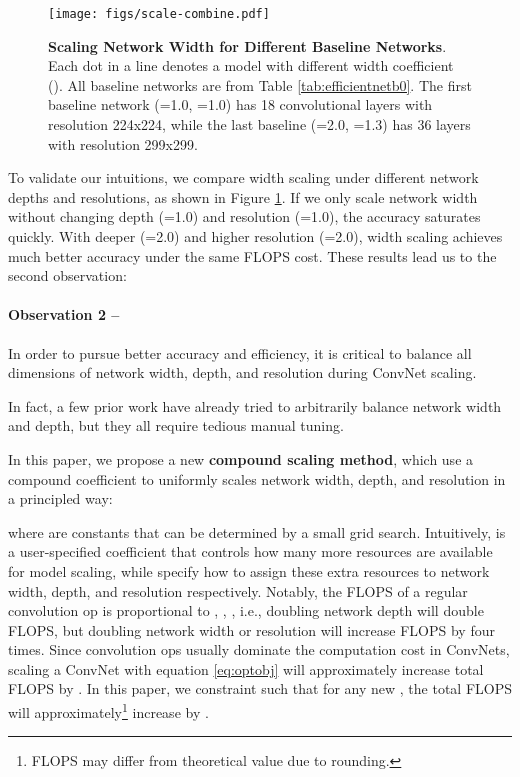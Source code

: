\documentclass{article}
\begin{document}
\begin{figure}                                                 
        \centering                                                                  
        \texttt{[image: figs/scale-combine.pdf]}      
        \vskip -0.1in          
        \caption{\textbf{Scaling Network Width for Different Baseline Networks}. Each dot in a line denotes a model with different width coefficient (). All baseline networks are from Table \ref{tab:efficientnetb0}.
        The first  baseline network (=1.0, =1.0) has 18 convolutional layers  with resolution 224x224, while the last baseline (=2.0, =1.3) has 36 layers with resolution 299x299. 
}                                                                           
        \label{fig:scale-combine}  
        \vskip  -0.2in 

\end{figure} 
To validate our intuitions, we compare width scaling under different network depths and resolutions, as shown in Figure \ref{fig:scale-combine}.  If we only scale network width  without changing depth (=1.0) and resolution (=1.0), the accuracy saturates quickly.  With deeper (=2.0) and higher resolution (=2.0), width scaling  achieves much better accuracy under the same FLOPS cost. These results lead us to the second observation:

\noindent \paragraph{Observation 2 -- } In order to pursue better accuracy and efficiency, it is critical to balance all dimensions of network width, depth, and resolution during ConvNet scaling.

In fact, a few prior work \cite{nas_imagenet18, amoebanets18} have already tried to arbitrarily balance network width and depth, but they all require tedious manual tuning. 
 
In this paper, we propose a new \textbf{compound scaling method}, which use a compound  coefficient  to 
uniformly scales network width, depth, and resolution in a  principled way:

\vspace{-0.1in}


where  are constants that can be determined by a small grid search.  Intuitively,   is a user-specified coefficient that controls how many more resources are available for model scaling, while   specify how to assign these extra resources to network width, depth, and resolution respectively. Notably, the FLOPS of a regular convolution op is proportional to , , , i.e., doubling network depth will double FLOPS, but doubling network width or resolution will increase FLOPS by four times. Since convolution ops usually dominate the computation cost in ConvNets, scaling a ConvNet with equation \ref{eq:optobj} will approximately increase total FLOPS by .
In this paper, we constraint  such that for any new , the total FLOPS will approximately\footnote{FLOPS may differ from theoretical value due to rounding.} increase by . 
\end{document}
